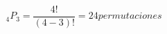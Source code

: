 \documentclass[preview]{standalone}
\begin{document}
\begin{center}
\[{}_4P_3 = \frac{4!}{(4-3)!} = 24 permutaciones\]
\end{center}
\end{document}
